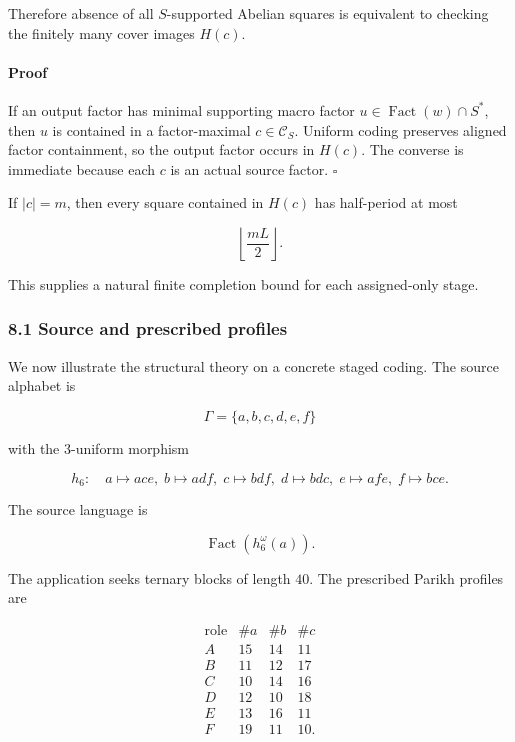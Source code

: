 \documentclass[
  british,
  a4paper,
  11pt]{article}
\begin{document}
Therefore absence of all \(S\)-supported Abelian squares is equivalent
to checking the finitely many cover images \(H(c)\).

\paragraph{Proof}\label{proof-6}

If an output factor has minimal supporting macro factor \(u\in
\operatorname{Fact}(w)\cap S^*\), then \(u\) is contained in a
factor-maximal \(c\in\mathcal C_S\). Uniform coding preserves aligned
factor containment, so the output factor occurs in \(H(c)\). The
converse is immediate because each \(c\) is an actual source factor.
\(\square\)

If \(|c|=m\), then every square contained in \(H(c)\) has half-period at
most

\[
\left\lfloor \frac{mL}{2}\right\rfloor.
\tag{8.1}
\]

This supplies a natural finite completion bound for each assigned-only
stage.

\subsubsection{8.1 Source and prescribed
profiles}\label{source-and-prescribed-profiles}

We now illustrate the structural theory on a concrete staged coding. The
source alphabet is

\[
\Gamma=\{a,b,c,d,e,f\}
\]

with the \(3\)-uniform morphism

\[
h_6:
\quad
a\mapsto ace,\;
b\mapsto adf,\;
c\mapsto bdf,\;
d\mapsto bdc,\;
e\mapsto afe,\;
f\mapsto bce.
\tag{8.2}
\]

The source language is

\[
\operatorname{Fact}(h_6^\omega(a)).
\]

The application seeks ternary blocks of length \(40\). The prescribed
Parikh profiles are

\[
\begin{array}{c|ccc}
\text{role}&\#a&\#b&\#c\\
\hline
A&15&14&11\\
B&11&12&17\\
C&10&14&16\\
D&12&10&18\\
E&13&16&11\\
F&19&11&10.
\end{array}
\tag{8.3}
\]
\end{document}
